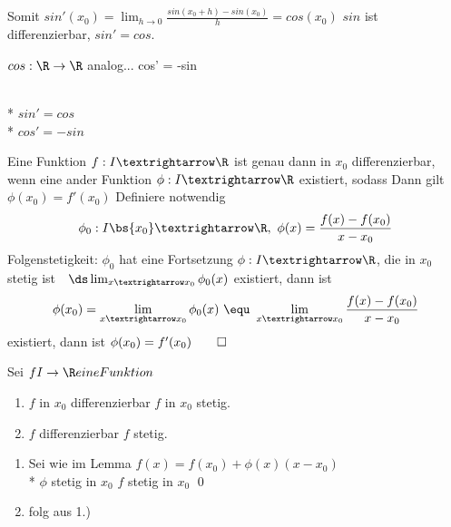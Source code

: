 {{{}
Somit $sin'(x_0) = \lim_{h \to 0} \frac{sin(x_0 + h) - sin(x_0)}{h} = cos(x_0)$
\Rarr{} $sin$ ist differenzierbar, $sin' = cos$.}
\item{$cos: \R \to \R $ analog... cos' = -sin\\
\\*
$ sin' = cos $ \\*
$ cos' = -sin $}
}

Eine Funktion $f:I→\R$ ist genau dann in $x_0$ differenzierbar, wenn eine ander Funktion $\phi:I→\R$ existiert, sodass
Dann gilt $\phi(x_0) =f'(x_0)$
\bew
Definiere notwendig
$$\phi_0:I\bs\{x_0\}→\R,\ \phi(x)=\frac{f(x)-f(x_0)}{x-x_0}$$
Folgenstetigkeit: $ \phi_0$ hat eine Fortsetzung $\phi:I→\R$, die in $x_0$ stetig ist\ \equ\ $\ds\lim_{x→x_0}\phi_0(x)$ existiert, dann ist 
$$\phi(x_0)=\lim_{x→x_0}\phi_0(x)\ \equ\ \lim_{x→x_0}\frac{f(x)-f(x_0)}{x-x_0}$$
existiert, dann ist $\phi(x_0)=f'(x_0)\qed$

Sei $f I \to \R eine Funktion$
\begin{enumerate}
\item{$f$ in $x_0$ differenzierbar \Rarr{} $f$ in $x_0$ stetig.}
\item{$f$ differenzierbar \Rarr{} $f$ stetig.}
\end{enumerate}
\bew
\begin{enumerate}
\item{Sei \phi wie im Lemma \Rarr{} $f(x) = f(x_0) + \phi(x)(x-x_0)$\\*
$\phi$ stetig in $x_0$ \Rarr{} $f$ stetig in $x_0$ \qed}
\item{folg aus 1.)}
\end{enumerate}

